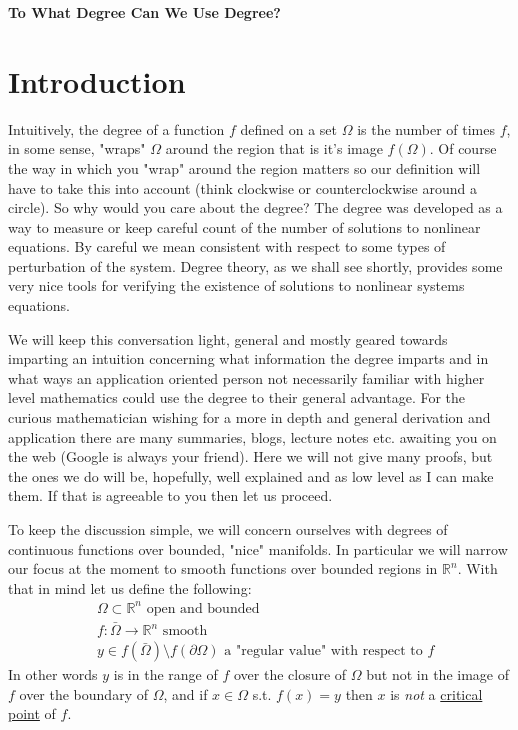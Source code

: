 \documentclass[11pt]{article}
\theoremstyle{plain}
\theoremstyle{definition}
\theoremstyle{remark}
\begin{document}
\begin{center}
\textbf{To What Degree Can We Use Degree?} %
\end{center}

\section{Introduction}
Intuitively, the degree of a function $f$ defined on a set $\Omega$
is the number of times $f$, in some sense, "wraps" $\Omega$ around the region that is it's image $f\left(\Omega\right)$.
Of course the way in which you "wrap" around the region matters so our definition will have to take this into account (think clockwise or counterclockwise around a circle). So why would you care about the degree? The degree was developed as a way to measure or keep careful count of the number of solutions to nonlinear equations. By careful we mean consistent with respect to some types of perturbation of the system. Degree theory, as we shall see shortly, provides some very nice tools for verifying the existence of solutions to nonlinear systems equations. 

\medskip
We will keep this conversation light, general and mostly geared towards imparting an intuition concerning what information the degree imparts and in what ways an application oriented person not necessarily familiar with higher level mathematics could use the degree to their general advantage. For the curious mathematician wishing for a more in depth and general derivation and application there are many summaries, blogs, lecture notes etc. awaiting you on the web (Google is always your friend). Here we will not give many proofs, but the ones we do will be, hopefully, well explained and as low level as I can make them. If that is agreeable to you then let us proceed. 

\medskip
To keep the discussion simple, %
we will concern ourselves with degrees of continuous functions over bounded, "nice" manifolds. In particular we will narrow our focus at the moment to smooth functions over bounded regions in $\mathbb{R}^n$. With that in mind let us define the following: 
\begin{subequations}\label{eq:Vars}
\begin{align}
& \Omega\subset\mathbb{R}^n \text{ open and bounded }\\
& f:\bar{\Omega}\rightarrow \mathbb{R}^n \text{ smooth } \\
& y\in f\left(\bar{\Omega}\right)\setminus f\left(\partial\Omega\right) \text{ a "regular value" with respect to $f$}
\end{align}
\end{subequations}
In other words $y$ is in the range of $f$ over the closure of $\Omega$ but not in the image of $f$ over the boundary of $\Omega$, and if $x\in\Omega$ s.t. $f(x)=y$ then $x$ is \emph{not} a \href{https://en.wikipedia.org/wiki/Critical_point_(mathematics)}{critical point} of $f$.  \\
\end{document}
